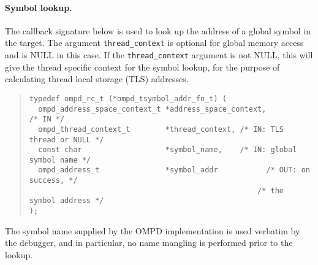 \paragraph{Symbol lookup.}
The callback signature below is used to look up
the address of a global symbol in the target.
The argument \texttt{thread\_context} is optional for global memory access
and is NULL in this case. 
If the \texttt{thread\_context} argument is not NULL,
this will give the thread specific context for the symbol lookup,
for the purpose of calculating thread local storage (TLS) addresses.
\begin{quote}
\begin{lstlisting}
typedef ompd_rc_t (*ompd_tsymbol_addr_fn_t) (
  ompd_address_space_context_t *address_space_context,              /* IN */
  ompd_thread_context_t        *thread_context, /* IN: TLS thread or NULL */
  const char                   *symbol_name,    /* IN: global symbol name */
  ompd_address_t               *symbol_addr           /* OUT: on success, */
                                                    /* the symbol address */
);
\end{lstlisting}
\end{quote}
The symbol name supplied by the OMPD implementation is used verbatim
by the debugger, and in particular, no name mangling is performed
prior to the lookup.



